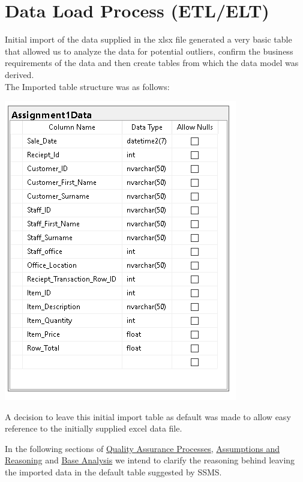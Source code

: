 \documentclass{article}
\begin{document}
    \section{Data Load Process (ETL/ELT)}
        Initial import of the data supplied in the xlsx file generated a very basic table
        that allowed us to analyze the data for potential outliers, confirm the business
        requirements of the data and then create tables from which the data model was derived.
        \\
        The Imported table structure was as follows:
        \begin{center}
            \includegraphics{Images/Initial_Import.PNG}
        \end{center}

        \noindent
        A decision to leave this initial import table as default
        was made to allow easy reference to the initially supplied
        excel data file.
        \par
        In the following sections of \hyperref[sec:QAP]{\color{blue}Quality Assurance Processes}, \hyperref[sec:AR]{\color{blue}Assumptions and Reasoning} and \hyperref[sec:BA]{\color{blue}Base Analysis} we intend to clarify the reasoning behind leaving the imported data in
        the default table suggested by SSMS.

        \newpage
\end{document}
